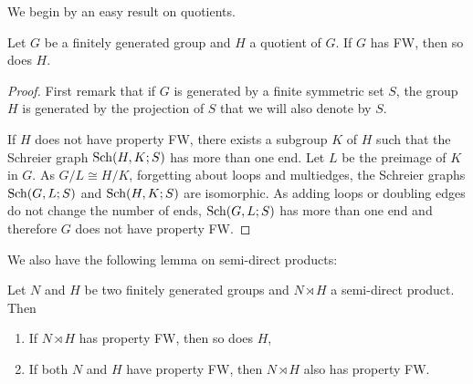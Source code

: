 We begin by an easy result on quotients.
%
%
\begin{lem}\label{Lem:Quotien}
Let $G$ be a finitely generated group and $H$ a quotient of $G$. If $G$ has FW, then so does $H$.
\end{lem}
%
\begin{proof}
First remark that if $G$ is generated by a finite symmetric set $S$, the group $H$ is generated by the projection of $S$ that we will also denote by $S$. 

If $H$ does not have property FW, there exists a subgroup $K$ of $H$ such that the Schreier graph $\operatorname{Sch}(H, K;S)$ has more than one end.
Let $L$ be the preimage of $K$ in $G$. As $G/L \cong H/K$, forgetting about loops and multiedges, the Schreier graphs $\operatorname{Sch}(G,L;S)$ and $\operatorname{Sch}(H,K;S)$ are isomorphic.%
As adding loops or doubling edges do not change the number of ends, $\operatorname{Sch}(G,L;S)$ has more than one end and therefore $G$ does not have property FW.
\end{proof}
%
%
We also have the following lemma on semi-direct products:
%
%
\begin{lem}\label{Lemma:Semidirect_ends}
Let $N$ and $H$ be two finitely generated groups and $N\rtimes H$ a semi-direct product.
Then
\begin{enumerate}
\item If $N\rtimes H$ has property FW, then so does $H$,
\item If both $N$ and $H$ have property FW, then $N\rtimes H$ also has property FW.
\end{enumerate}
\end{lem}
%
%
